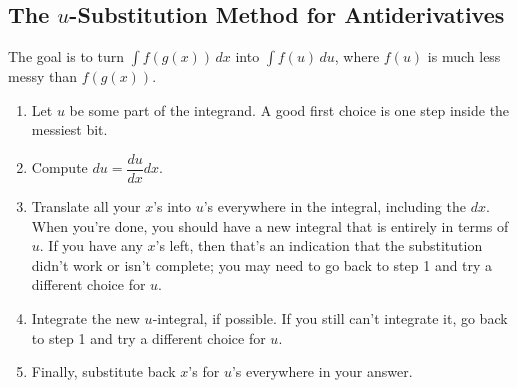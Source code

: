 \subsection{The $u$-Substitution Method for Antiderivatives}
The goal is to turn $\int f(g(x))\,dx$ into $\int f(u)\,du$, where $f(u)$ is much less messy than $f(g(x))$.
\begin{enumerate}
  \item Let $u$ be some part of the integrand. A good first choice is one step inside the messiest bit.
  \item Compute $du=\dfrac{du}{dx}dx$.
  \item Translate all your $x$'s into $u$'s everywhere in the integral, including the $dx$. When you're done, you should have a new integral that is entirely in terms of $u$. If you have any $x$'s left, then that's an indication that the substitution didn't work or isn't complete; you may need to go back to step 1 and try a different choice for $u$.
  \item Integrate the new $u$-integral, if possible. If you still can't integrate it, go back to step 1 and try a different choice for $u$.
  \item Finally, substitute back $x$'s for $u$'s everywhere in your answer.
\end{enumerate}
